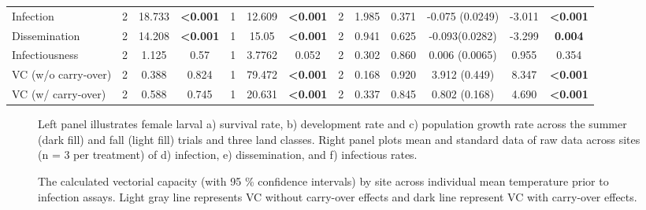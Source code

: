 \documentclass[12pt]{article}
\begin{document}
\begin{landscape}
\begin{table}[]
\begin{tabular}{l|ccc|ccc|ccc|ccc}
Infection                   & 2           & 18.733    & \textbf{\textless0.001} & 1           & 12.609    & \textbf{\textless0.001} & 2           & 1.985     & 0.371                   & -0.075 (0.0249)  & -3.011  & \textbf{\textless0.001} \\
Dissemination               & 2           & 14.208    & \textbf{\textless0.001} & 1           & 15.05     & \textbf{\textless0.001} & 2           & 0.941     & 0.625                   & -0.093(0.0282)   & -3.299  & \textbf{0.004}          \\
Infectiousness              & 2           & 1.125     & 0.57                    & 1           & 3.7762    & 0.052                   & 2           & 0.302     & 0.860                   & 0.006 (0.0065)   & 0.955   & 0.354                   \\
VC (w/o carry-over)         & 2           & 0.388     & 0.824                   & 1           & 79.472    & \textbf{\textless0.001} & 2           & 0.168     & 0.920                   & 3.912 (0.449)    & 8.347   & \textbf{\textless0.001} \\
VC (w/ carry-over)          & 2           & 0.588     & 0.745                   & 1           & 20.631    & \textbf{\textless0.001} & 2           & 0.337     & 0.845                   & 0.802 (0.168)    & 4.690   & \textbf{\textless0.001} \\
\end{tabular}
\end{table}

\end{landscape}

\begin{figure}
\centering
\caption{Left panel illustrates female larval a) survival rate, b) development rate and c) population growth rate across the summer (dark fill) and fall (light fill) trials and three land classes. Right panel plots mean and standard data of raw data across sites (n = 3 per treatment) of d) infection, e) dissemination, and f) infectious rates.}
\label{Fig:1}
\end{figure}

\begin{figure}
\centering
\caption{The calculated vectorial capacity (with 95 \% confidence intervals) by site across individual mean temperature prior to infection assays. Light gray line represents VC without carry-over effects and dark line represent VC with carry-over effects.}
\label{Fig:VC}
\end{figure}
\end{document}
